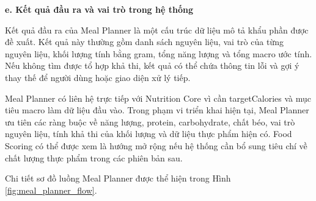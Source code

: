 \textbf{e. Kết quả đầu ra và vai trò trong hệ thống}

Kết quả đầu ra của Meal Planner là một cấu trúc dữ liệu mô tả khẩu phần được đề xuất. Kết quả này thường gồm danh sách nguyên liệu, vai trò của từng nguyên liệu, khối lượng tính bằng gram, tổng năng lượng và tổng macro ước tính. Nếu không tìm được tổ hợp khả thi, kết quả có thể chứa thông tin lỗi và gợi ý thay thế để người dùng hoặc giao diện xử lý tiếp.

Meal Planner có liên hệ trực tiếp với Nutrition Core vì cần targetCalories và mục tiêu macro làm dữ liệu đầu vào. Trong phạm vi triển khai hiện tại, Meal Planner ưu tiên các ràng buộc về năng lượng, protein, carbohydrate, chất béo, vai trò nguyên liệu, tính khả thi của khối lượng và dữ liệu thực phẩm hiện có. Food Scoring có thể được xem là hướng mở rộng nếu hệ thống cần bổ sung tiêu chí về chất lượng thực phẩm trong các phiên bản sau.

Chi tiết sơ đồ luồng Meal Planner được thể hiện trong Hình \ref{fig:meal_planner_flow}.

